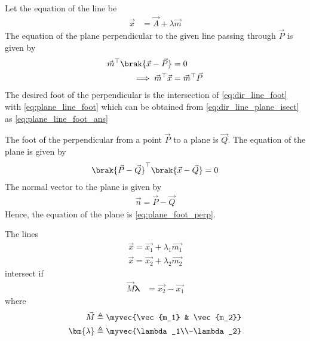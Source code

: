 \solution  Let the equation of the line be 
\begin{align}
	\label{eq:dir_line_foot}
	\vec{x} &= \vec{A} + \lambda \vec{m}
\end{align}
	The equation of the plane perpendicular to the given line passing through $\vec{P}$ is given by
\begin{align}
	\label{eq:plane_line_foot}
	\vec{m}^{\top}\brak{\vec{x}-\vec{P}}  &= 0
	\\
	\implies \vec{m}^{\top}\vec{x}  &= \vec{m}^{\top}\vec{P}
\end{align}
The desired foot of the perpendicular is the intersection of 
	\eqref{eq:dir_line_foot} with 
	\eqref{eq:plane_line_foot}
	which can be obtained from 
	\eqref{eq:dir_line_plane_isect}
	as 
	\eqref{eq:plane_line_foot_ans}
\item The foot of the perpendicular from a point $\vec{P}$ to a plane is $\vec{Q}$.  The equation of the plane is given by 
\begin{align}
	\label{eq:plane_foot_perp}
	\brak{\vec{P}-\vec{Q}}^{\top}\brak{\vec{x}-\vec{Q}} = 0
\end{align}
	\solution  The normal vector to the plane is given by 
\begin{align}
	\vec{n}= \vec{P}-\vec{Q} 
\end{align}
	Hence, the equation of the plane is
	\eqref{eq:plane_foot_perp}.
\item The lines 
    \begin{align}
        \vec{x} = \vec{x_1} + \lambda_1\vec{m_1} \label{eq:chapters/12/11/2/16/L1-gen} \\
        \vec{x} = \vec{x_2} + \lambda_2\vec{m_2} \label{eq:chapters/12/11/2/16/L2-gen}
    \end{align}
    intersect if
    \begin{align}
       \vec{M}\bm{\lambda} &= \vec{x_2} - \vec{x_1}
        \label{eq:chapters/12/11/2/16/intersect-cond}
    \end{align}
    where
    \begin{align}
        \vec{M} \triangleq \myvec{\vec{m_1} & \vec{m_2}} \label{eq:chapters/12/11/2/16/M-def} \\
        \bm{\lambda} \triangleq \myvec{\lambda_1\\-\lambda_2}
        \label{eq:chapters/12/11/2/16/lambda-def}
    \end{align}
\item 
